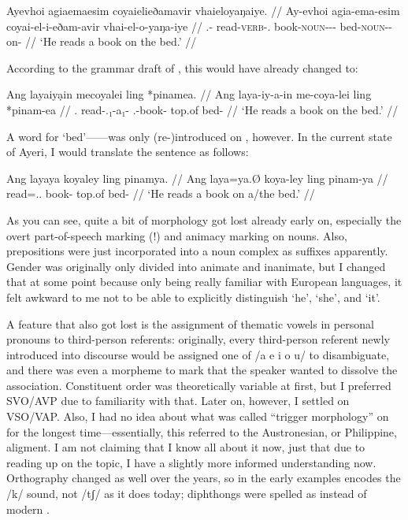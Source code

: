 \ex\begingl
	\gla Ayevhoi agiaemaesim coyaielieðamavir vhaieloyaŋaiye. //
	\glb Ay-evhoi agia-ema-esim coyai-el-i-eðam-avir vhai-el-o-yaŋa-iye //
	\glc \Tsg{}.\An{}-\Sbj{} read-\textsc{verb}-\Sbj{}.\An{} 
		book-\textsc{noun}-\An{}-\Indf{}-\Parg{} 
		bed-\textsc{noun}-\Inan{}-on-\Loc{} //
	\glft `He reads a book on the bed.' //
\endgl\xe

According to the grammar draft of , this would have already 
changed to:

\ex\begingl
	\gla Ang layaiyạin mecoyalei ling *pinamea. //
	\glb Ang laya-iy-a-in me-coya-lei ling *pinam-ea //
	\glc \Aarg{}.\Sbj{} read-\Tsg{}.\An{}₁-a₁-\Sbj{} 
		\Indf{}.\Inan{}-book-\PargI{} top.of bed-\Loc{} //
	\glft `He reads a book on the bed.' //
\endgl\xe

A word for `bed'------was only (re-)introduced on 
, however. In the current state of Ayeri, I would translate 
the sentence as follows:

\ex\begingl
	\gla Ang layaya koyaley ling pinamya. //
	\glb Ang laya=ya.Ø koya-ley ling pinam-ya //
	\glc \AgtT{} read=\Tsg{}.\M{}.\Top{} book-\PargI{} top.of bed-\Loc{} //
	\glft `He reads a book on a/the bed.' //
\endgl\xe

As you can see, quite a bit of morphology got lost already early on, especially 
the overt part-of-speech marking (!) and animacy marking on nouns. Also, 
prepositions were just incorporated into a noun complex as suffixes apparently. 
Gender was originally only divided into animate and inanimate, but I changed 
that at some point because only being really familiar with European languages, 
it felt awkward to me not to be able to explicitly distinguish `he', `she', and 
`it'.

A feature that also got lost is the assignment of thematic vowels in personal 
pronouns to third-person referents: originally, every third-person referent 
newly introduced into discourse would be assigned one of /a e i o u/ to 
disambiguate, and there was even a morpheme to mark that the speaker wanted to 
dissolve the association. Constituent order was theoretically variable at first, 
but I preferred SVO/AVP due to familiarity with that. Later on, however, I 
settled on VSO/VAP. Also, I had no idea about what was called 
``trigger morphology'' on  for the longest time---essentially, 
this referred to the Austronesian, or Philippine, aligment. I am not claiming 
that I know all about it now, just that due to reading up on the topic, I have 
a slightly more informed understanding now. Orthography changed as well over 
the years, so  in the early examples encodes the /k/ sound, not /tʃ/ as 
it does today; diphthongs were spelled as  instead of modern .


